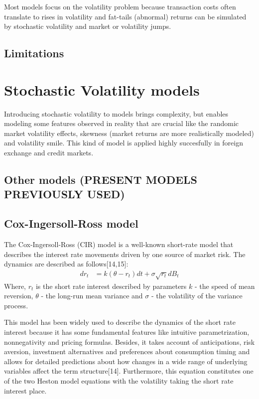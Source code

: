 \documentclass[12pt,twoside]{reedthesis}
\theoremstyle{definition}
\theoremstyle{definition}
\theoremstyle{remark}
\begin{document}
  Most models focus on the volatility problem because transaction costs
  often translate to rises in volatility and fat-tails (abnormal) returns
  can be simulated by stochastic volatility and market or volatility
  jumps.
  
  \subsection{Limitations}\label{limitations}
  
  \section{Stochastic Volatility
  models}\label{stochastic-volatility-models}
  
  Introducing stochastic volatility to models brings complexity, but
  enables modeling some features observed in reality that are crucial like
  the randomic market volatility effects, skewness (market returns are
  more realistically modeled) and volatility smile. This kind of model is
  applied highly succesfully in foreign exchange and credit markets.
  
  \subsection{Other models (PRESENT MODELS PREVIOUSLY
  USED)}\label{other-models-present-models-previously-used}
  
  \subsection{Cox-Ingersoll-Ross model}\label{cox-ingersoll-ross-model}
  
  The Cox-Ingersoll-Ross (CIR) model is a well-known short-rate model that
  describes the interest rate movements driven by one source of market
  risk. The dynamics are described as follows{[}14,15{]}:
  \begin{align}
  \label{eq:cir}
  dr_t &= k(\theta - r_t)dt + \sigma \sqrt{r_t} dB_t
  \end{align}
  \noindent
  Where, \(r_t\) is the short rate interest described by parameters \(k\)
  - the speed of mean reversion, \(\theta\) - the long-run mean variance
  and \(\sigma\) - the volatility of the variance process.
  
  This model has been widely used to describe the dynamics of the short
  rate interest because it has some fundamental features like intuitive
  parametrization, nonnegativity and pricing formulas. Besides, it takes
  account of anticipations, risk aversion, investment alternatives and
  preferences about consumption timing and allows for detailed predictions
  about how changes in a wide range of underlying variables affect the
  term structure{[}14{]}. Furthermore, this equation constitutes one of
  the two Heston model equations with the volatility taking the short rate
  interest place.
  
\end{document}
